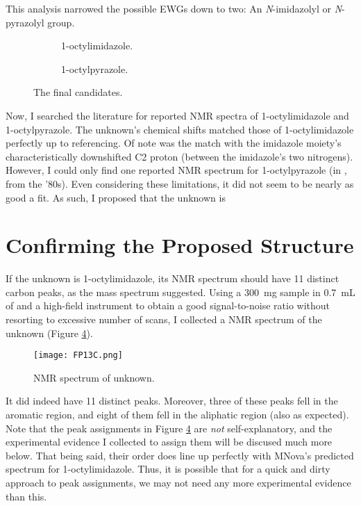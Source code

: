 \documentclass[titlepage]{article}
\begin{document}
This analysis narrowed the possible EWGs down to two: An \emph{N}-imidazolyl or \emph{N}-pyrazolyl group.
\begin{figure}[H]
    \centering
    \footnotesize
    \begin{subfigure}[b]{0.45\linewidth}
        \centering
        \caption{1-octylimidazole.}
        \label{fig:FPOcIma}
    \end{subfigure}
    \begin{subfigure}[b]{0.45\linewidth}
        \centering
        \caption{1-octylpyrazole.}
        \label{fig:FPOcImb}
    \end{subfigure}
    \caption{The final candidates.}
    \label{fig:FPOcIm}
\end{figure}
Now, I searched the literature for reported  NMR spectra of 1-octylimidazole\supercite{bib:FPOcIm} and 1-octylpyrazole.\supercite{bib:FPOcPz} The unknown's chemical shifts matched those of 1-octylimidazole perfectly up to referencing. Of note was the match with the imidazole moiety's characteristically downshifted C2 proton (between the imidazole's two nitrogens). However, I could only find one reported  NMR spectrum for 1-octylpyrazole (in , from the '80s). Even considering these limitations, it did not seem to be nearly as good a fit. As such, I proposed that the unknown is 
\newpage



\section{Confirming the Proposed Structure}\label{sse:Confirm}
If the unknown is 1-octylimidazole, its  NMR spectrum should have 11 distinct carbon peaks, as the mass spectrum suggested. Using a \SI{300}{\milli\gram} sample in \SI{0.7}{\milli\liter} of  and a high-field instrument to obtain a good signal-to-noise ratio without resorting to excessive number of scans, I collected a  NMR spectrum of the unknown (Figure \ref{fig:FP13C}).
\begin{figure}[H]
    \centering
    \texttt{[image: FP13C.png]}
    \caption{ NMR spectrum of unknown.}
    \label{fig:FP13C}
\end{figure}
It did indeed have 11 distinct peaks. Moreover, three of these peaks fell in the aromatic region, and eight of them fell in the aliphatic region (also as expected). Note that the peak assignments in Figure \ref{fig:FP13C} are \emph{not} self-explanatory, and the experimental evidence I collected to assign them will be discused much more below. That being said, their order does line up perfectly with MNova's predicted  spectrum for 1-octylimidazole. Thus, it is possible that for a quick and dirty approach to peak assignments, we may not need any more experimental evidence than this.
\newpage
\end{document}

